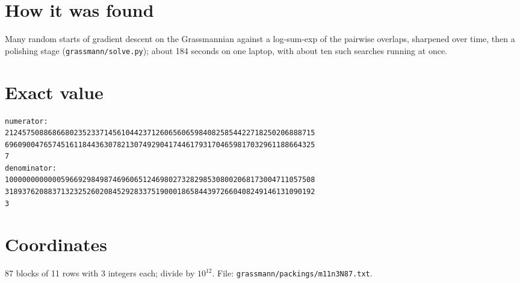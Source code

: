 \documentclass[11pt,a4paper]{article}
\begin{document}
\section{How it was found}
Many random starts of gradient descent on the Grassmannian against a log-sum-exp of the pairwise overlaps, sharpened over time, then a polishing stage (\texttt{grassmann/solve.py}); about 184 seconds on one laptop, with about ten such searches running at once.


\appendix
\section{Exact value}
{\small
\begin{verbatim}
numerator:
212457508868668023523371456104423712606560659840825854422718250206888715
696090047657451611844363078213074929041744617931704659817032961188664325
7
denominator:
100000000000059669298498746960651246980273282985308002068173004711057508
318937620883713232526020845292833751900018658443972660408249146131090192
3
\end{verbatim}}

\section{Coordinates}
87 blocks of 11 rows with 3 integers each; divide by $10^{12}$. File: \texttt{grassmann/packings/m11n3N87.txt}.
{\tiny
\begin{multicols}{3}
\end{multicols}}
\end{document}
